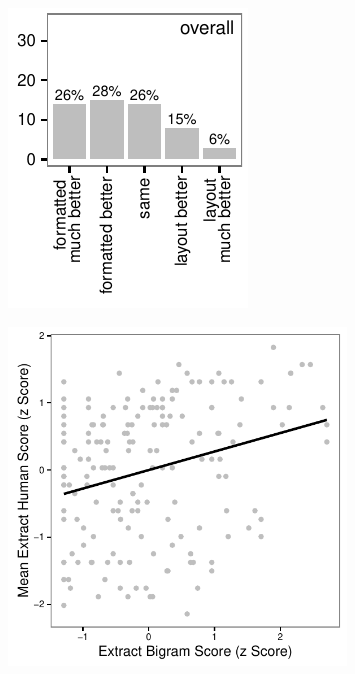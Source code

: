 	  \begin{figure}
		\centering
		\begin{minipage}{.25\textwidth}
		  \centering
		  \includegraphics[width=\textwidth]{graphs/layout_vs_formatted_hists}
		  \label{fig:lay_vs_formatted_hist}
		\end{minipage}%
		\begin{minipage}{.5\textwidth}
		  \centering
		  \includegraphics[width=0.8\textwidth]{graphs/scatter}

\end{minipage}
\end{figure}
